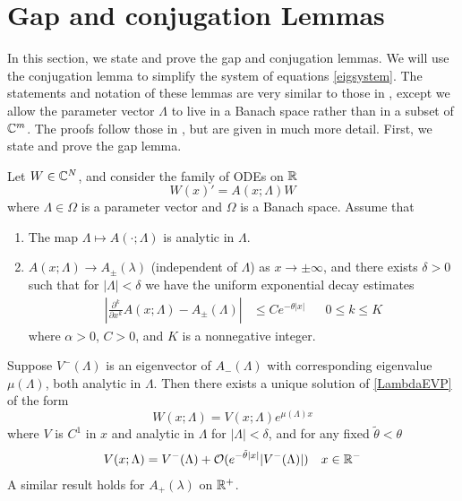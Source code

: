 \documentclass[thesis.tex]{subfiles}
\begin{document}
\section{Gap and conjugation Lemmas}

In this section, we state and prove the gap and conjugation lemmas. We will use the conjugation lemma to simplify the system of equations \cref{eigsystem}. The statements and notation of these lemmas are very similar to those in \cite{Zumbrun2009}, except we allow the parameter vector $\Lambda$ to live in a Banach space rather than in a subset of $\mathbb{C}^m$. The proofs follow those in \cite{Zumbrun2009}, but are given in much more detail. First, we state and prove the gap lemma.

\begin{lemma}\label{gaplemma}
Let $W \in \mathbb{C}^N$, and consider the family of ODEs on $\mathbb{R}$
\begin{equation}\label{LambdaEVP}
W(x)' = A(x; \Lambda) W
\end{equation}
where $\Lambda \in \Omega$ is a parameter vector and $\Omega$ is a Banach space. Assume that
\begin{enumerate}
	\item The map $\Lambda \mapsto A(\cdot; \Lambda)$ is analytic in $\Lambda$.
	\item $A(x; \Lambda) \rightarrow A_\pm(\lambda)$ (independent of $\Lambda$) as $x \rightarrow \pm \infty$, and there exists $\delta > 0$ such that for $|\Lambda| < \delta$ we have the uniform exponential decay estimates 
	\begin{align}\label{ALambdadecay}
	\left| \frac{\partial^k}{\partial x^k} A(x; \Lambda) - A_\pm(\Lambda) \right| 
	&\leq C e^{-\theta |x|} && 0 \leq k \leq K
	\end{align}
	where $\alpha > 0$, $C > 0$, and $K$ is a nonnegative integer.
\end{enumerate}
Suppose $V^-(\Lambda)$ is an eigenvector of $A_-(\Lambda)$ with corresponding eigenvalue $\mu(\Lambda)$, both analytic in $\Lambda$. Then there exists a unique solution of \ref{LambdaEVP} of the form 
\begin{equation}
W(x; \Lambda) = V(x; \Lambda) e^{\mu(\Lambda)x}
\end{equation}
where $V$ is $C^1$ in $x$ and analytic in $\Lambda$ for $|\Lambda| < \delta$, and for any fixed $\tilde{\theta} < \theta$
\begin{align}
V(x; \Lambda) = V^-(\Lambda) + \mathcal{O}(e^{-\tilde{\theta}|x|}|V^-(\Lambda)|) && x \in \mathbb{R}^-
\end{align}
A similar result holds for $A_+(\lambda)$ on $\mathbb{R}^+$.


\end{lemma}
\end{document}
